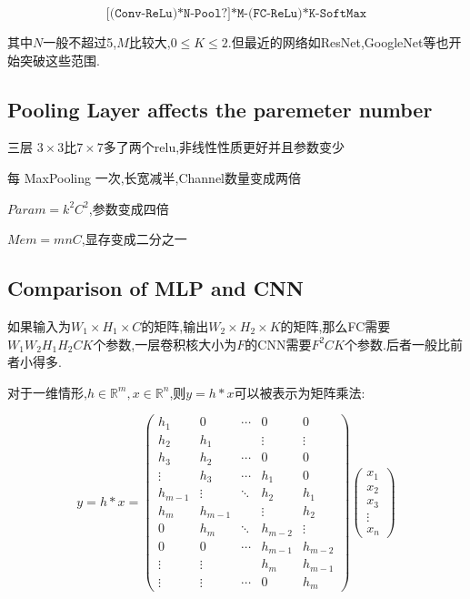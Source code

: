 \[\texttt{[(Conv-ReLu)*N-Pool?]*M-(FC-ReLu)*K-SoftMax}\]

其中$N$一般不超过5,$M$比较大,$0\le K \le 2$.但最近的网络如ResNet,GoogleNet等也开始突破这些范围.

\subsection{Pooling Layer affects the paremeter number}

三层 $3\times3$比$7\times7$多了两个relu,非线性性质更好并且参数变少

每 MaxPooling 一次,长宽减半,Channel数量变成两倍

$Param=k^2C^2$,参数变成四倍

$Mem=mnC$,显存变成二分之一

\subsection{Comparison of MLP and CNN}

如果输入为$W_1 \times H_1 \times C$的矩阵,输出$W_2 \times H_2 \times K$的矩阵,那么FC需要$W_1W_2H_1H_2CK$个参数,一层卷积核大小为$F$的CNN需要$F^2CK$个参数.后者一般比前者小得多.

对于一维情形,$h \in \mathbb R^m, x\in \mathbb R^n$,则$y = h * x$可以被表示为矩阵乘法:

\begin{equation}
	y=h * x=
	\begin{pmatrix}
		h_{1} & 0 & \cdots & 0 & 0 \\
		h_{2} & h_{1} & & \vdots & \vdots \\
		h_{3} & h_{2} & \cdots & 0 & 0 \\
		\vdots & h_{3} & \cdots & h_{1} & 0 \\
		h_{m-1} & \vdots & \ddots & h_{2} & h_{1} \\
		h_{m} & h_{m-1} & & \vdots & h_{2} \\
		0 & h_{m} & \ddots & h_{m-2} & \vdots \\
		0 & 0 & \cdots & h_{m-1} & h_{m-2} \\
		\vdots & \vdots & & h_{m} & h_{m-1}\\
		\vdots &\vdots & \cdots  &0 & h_{m}
	\end{pmatrix}
	\begin{pmatrix}
		x_{1} \\
		x_{2} \\
		x_{3} \\
		\vdots \\
		x_{n}
	\end{pmatrix}
\end{equation}

